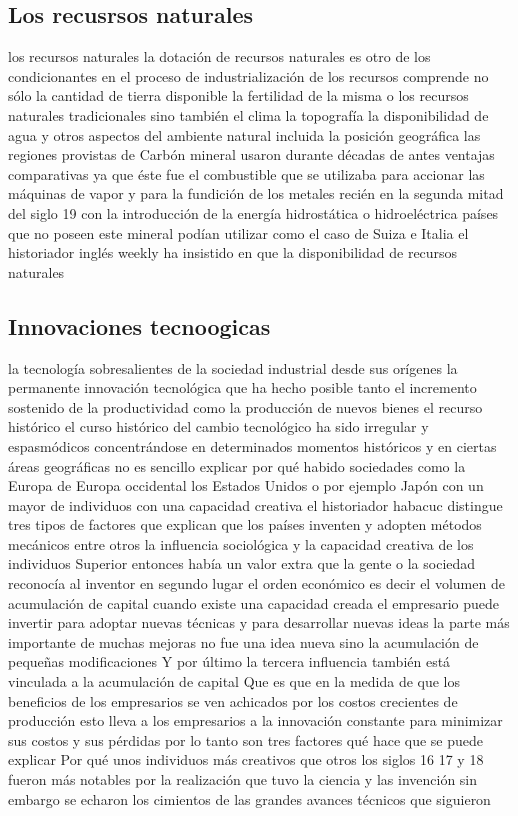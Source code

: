 \documentclass[12pt]{book}++
\begin{document}
\subsection{Los recusrsos naturales}
los recursos naturales la dotación de recursos naturales es otro de los condicionantes en el proceso de industrialización de los recursos comprende no sólo la cantidad de tierra disponible la fertilidad de la misma o los recursos naturales tradicionales sino también el clima la topografía la disponibilidad de agua y otros aspectos del ambiente natural incluida la posición geográfica las regiones provistas de Carbón mineral usaron durante décadas de antes ventajas comparativas ya que éste fue el combustible que se utilizaba para accionar las máquinas de vapor y para la fundición de los metales recién en la segunda mitad del siglo 19 con la introducción de la energía hidrostática o hidroeléctrica países que no poseen este mineral podían utilizar como el caso de Suiza e Italia el historiador inglés weekly ha insistido en que la disponibilidad de recursos naturales
\subsection{Innovaciones tecnoogicas}
la tecnología sobresalientes de la sociedad industrial desde sus orígenes la permanente innovación tecnológica que ha hecho posible tanto el incremento sostenido de la productividad como la producción de nuevos bienes el recurso histórico el curso histórico del cambio tecnológico ha sido irregular y espasmódicos concentrándose en determinados momentos históricos y en ciertas áreas geográficas no es sencillo explicar por qué habido sociedades como la Europa de Europa occidental los Estados Unidos o por ejemplo Japón con un mayor de individuos con una capacidad creativa el historiador habacuc distingue tres tipos de factores que explican que los países inventen y adopten métodos mecánicos entre otros la influencia sociológica y la capacidad creativa de los individuos Superior entonces había un valor extra que la gente o la sociedad reconocía al inventor en segundo lugar el orden económico es decir el volumen de acumulación de capital cuando existe una capacidad creada el empresario puede invertir para adoptar nuevas técnicas y para desarrollar nuevas ideas la parte más importante de muchas mejoras no fue una idea nueva sino la acumulación de pequeñas modificaciones Y por último la tercera influencia también está vinculada a la acumulación de capital Que es que en la medida de que los beneficios de los empresarios se ven achicados por los costos crecientes de producción esto lleva a los empresarios a la innovación constante para minimizar sus costos y sus pérdidas por lo tanto son tres factores qué hace que se puede explicar Por qué unos individuos más creativos que otros los siglos 16 17 y 18 fueron más notables por la realización que tuvo la ciencia y las invención sin embargo se echaron los cimientos de las grandes avances técnicos que siguieron
\end{document}
